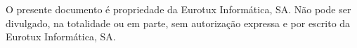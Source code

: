 O presente documento é propriedade da Eurotux Informática, SA. Não pode ser divulgado, na totalidade ou em parte, sem autorização expressa e por escrito da Eurotux Informática, SA.
